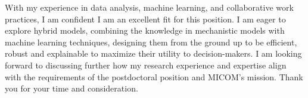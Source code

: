 \documentclass[11pt, a4paper]{awesome-cv}
\begin{document}
\begin{cvletter}
With my experience in data analysis, machine learning, and collaborative work practices, I am confident I am an excellent fit for this position. I am eager to explore hybrid models, combining the knowledge in mechanistic models with machine learning techniques, designing them from the ground up to be efficient, robust and explainable to maximize their utility to decision-makers. I am looking forward to discussing further how my research experience and expertise align with the requirements of the postdoctoral position and MICOM's mission. Thank you for your time and consideration.

\end{cvletter}

\makeletterclosing
\end{document}
